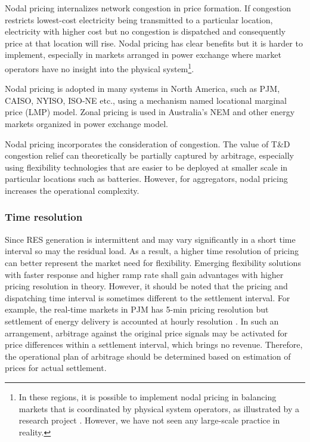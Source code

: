 Nodal pricing internalizes network congestion in price formation. If congestion restricts lowest-cost electricity being transmitted to a particular location, electricity with higher cost but no congestion is dispatched and consequently price at that location will rise. Nodal pricing has clear benefits \cite{Wang2015} but it is harder to implement, especially in markets arranged in power exchange where market operators have no insight into the physical system\footnote{In these regions, it is possible to implement nodal pricing in balancing markets that is coordinated by physical system operators, as illustrated by a research project \cite{Ecogrid}. However, we have not seen any large-scale practice in reality.}. 

Nodal pricing is adopted in many systems in North America, such as PJM, CAISO, NYISO, ISO-NE etc., using a mechanism named locational marginal price (LMP) model. Zonal pricing is used in Australia's NEM and other energy markets organized in power exchange model. 

Nodal pricing incorporates the consideration of congestion. The value of T\&D congestion relief can theoretically be partially captured by arbitrage, especially using flexibility technologies that are easier to be deployed at smaller scale in particular locations such as batteries. However, for aggregators, nodal pricing increases the operational complexity.

\subsubsection{Time resolution}
Since RES generation is intermittent and may vary significantly in a short time interval so may the residual load. As a result, a higher time resolution of pricing can better represent the market need for flexibility. Emerging flexibility solutions with faster response and higher ramp rate shall gain advantages with higher pricing resolution in theory. However, it should be noted that the pricing and dispatching time interval is sometimes different to the settlement interval. For example, the real-time markets in PJM has 5-min pricing resolution but settlement of energy delivery is accounted at hourly resolution \cite{PJM2017}. In such an arrangement, arbitrage against the original price signals may be activated for price differences within a settlement interval, which brings no revenue. Therefore, the operational plan of arbitrage should be determined based on estimation of prices for actual settlement.



